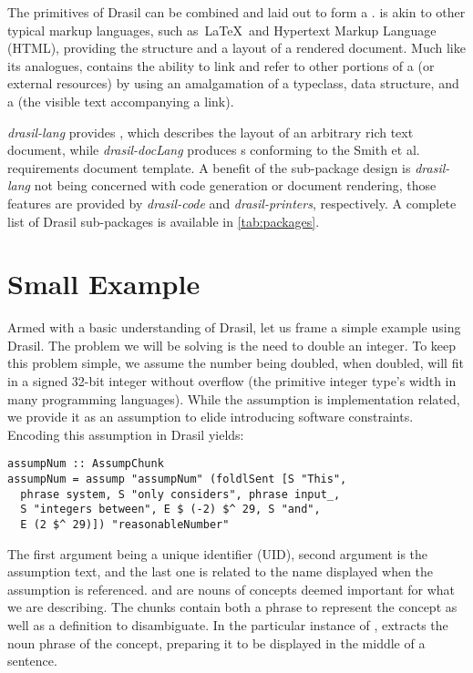 The primitives of Drasil can be combined and laid out to form a .  is akin to other typical markup languages, such as\ \LaTeX\ and Hypertext Markup Language (HTML), providing the structure and a layout of a rendered document. Much like its analogues,  contains the ability to link and refer to other portions of a  (or external resources) by using an amalgamation of a  typeclass,  data structure, and a  (the visible text accompanying a link). 


\textit{drasil-lang} provides , which describes the layout of an arbitrary rich text document, while \textit{drasil-docLang} produces s conforming to the Smith et al.~\cite{smith2005new} requirements document template. A benefit of the sub-package design is \textit{drasil-lang} not being concerned with code generation or document rendering, those features are provided by \textit{drasil-code} and \textit{drasil-printers}, respectively. A complete list of Drasil sub-packages is available in \autoref{tab:packages}.

\section{Small Example}\label{teExample}
Armed with a basic understanding of Drasil, let us frame a simple example using Drasil. The problem we will be solving is the need to double an integer. To keep this problem simple, we assume the number being doubled, when doubled, will fit in a signed 32-bit integer without overflow (the primitive integer type's width in many programming languages). While the assumption is implementation related, we provide it as an assumption to elide introducing software constraints. Encoding this assumption in Drasil yields:
\begin{tcolorbox}
\begin{verbatim}
assumpNum :: AssumpChunk
assumpNum = assump "assumpNum" (foldlSent [S "This",
  phrase system, S "only considers", phrase input_,
  S "integers between", E $ (-2) $^ 29, S "and",
  E (2 $^ 29)]) "reasonableNumber"
\end{verbatim}
\end{tcolorbox}
The first argument being a unique identifier (UID), second argument is the assumption text, and the last one is related to the name displayed when the assumption is referenced.  and  are nouns of concepts deemed important for what we are describing. The chunks contain both a phrase to represent the concept as well as a definition to disambiguate. In the particular instance of ,  extracts the noun phrase of the concept, preparing it to be displayed in the middle of a sentence.

